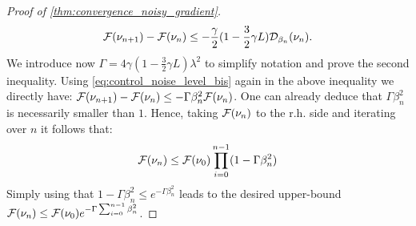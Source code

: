 \begin{proof}[Proof of \cref{thm:convergence_noisy_gradient}]
\[
{{\mathcal F}}(\nu_{n+1}) -{{\mathcal F}}(\nu_n) \leq -\frac{\gamma}{2}(1-\frac{3}{2}\gamma L)\mathcal{D}_{\beta_n}(\nu_n).
\]
We introduce now $\Gamma = 4\gamma(1-\frac{3}{2}\gamma L)\lambda^2$ to simplify notation and prove the second inequality. Using \cref{eq:control_noise_level_bis} again in the above inequality we directly have: ${{\mathcal F}}(\nu_{n+1}) -{{\mathcal F}}(\nu_n) \leq - \Gamma\beta_n^2 {{\mathcal F}}(\nu_n)$. One can already deduce that $\Gamma\beta_n^2$ is necessarily smaller than $1$. Hence, taking ${{\mathcal F}}(\nu_n)$ to the r.h. side and iterating over $n$ it follows that: 
\[
{{\mathcal F}}(\nu_{n}) \leq {{\mathcal F}}(\nu_0)\prod_{i=0}^{n-1}(1- \Gamma\beta_n^2)
\]
Simply using that $1-\Gamma\beta_n^2\leq e^{-\Gamma\beta_n^2}$ leads to the desired upper-bound ${{\mathcal F}}(\nu_{n}) \leq {{\mathcal F}}(\nu_0)e^{-\Gamma \sum_{i=0}^{n-1} \beta_n^2}$.
\end{proof}






